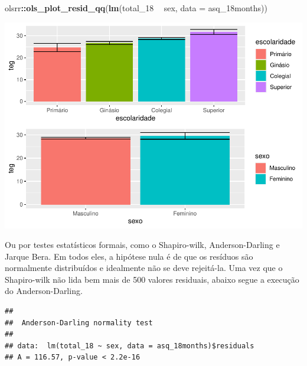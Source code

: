 \documentclass[
]{book}
\newenvironment{Shaded}{\begin{snugshade}}{\end{snugshade}}
\newcommand{\DataTypeTok}[1]{\textcolor[rgb]{0.13,0.29,0.53}{#1}}
\newcommand{\DecValTok}[1]{\textcolor[rgb]{0.00,0.00,0.81}{#1}}
\newcommand{\KeywordTok}[1]{\textcolor[rgb]{0.13,0.29,0.53}{\textbf{#1}}}
\newcommand{\NormalTok}[1]{#1}
\newcommand{\OperatorTok}[1]{\textcolor[rgb]{0.81,0.36,0.00}{\textbf{#1}}}
\newcommand{\StringTok}[1]{\textcolor[rgb]{0.31,0.60,0.02}{#1}}
\begin{document}
\begin{Shaded}
\begin{Highlighting}[]
\NormalTok{olsrr}\OperatorTok{::}\KeywordTok{ols_plot_resid_qq}\NormalTok{(}\KeywordTok{lm}\NormalTok{(total_}\DecValTok{18} \OperatorTok{~}\StringTok{ }\NormalTok{sex, }\DataTypeTok{data =}\NormalTok{ asq_18months))}
\end{Highlighting}
\end{Shaded}

\begin{center}\includegraphics{gitbook-demo_files/figure-latex/unnamed-chunk-66-1} \end{center}

Ou por testes estatísticos formais, como o Shapiro-wilk, Anderson-Darling e Jarque Bera. Em todos eles, a hipótese nula é de que os resíduos são normalmente distribuídos e idealmente não se deve rejeitá-la. Uma vez que o Shapiro-wilk não lida bem mais de 500 valores residuais, abaixo segue a execução do Anderson-Darling.

\begin{Shaded}
\end{Shaded}

\begin{verbatim}
## 
##  Anderson-Darling normality test
## 
## data:  lm(total_18 ~ sex, data = asq_18months)$residuals
## A = 116.57, p-value < 2.2e-16
\end{verbatim}
\end{document}
